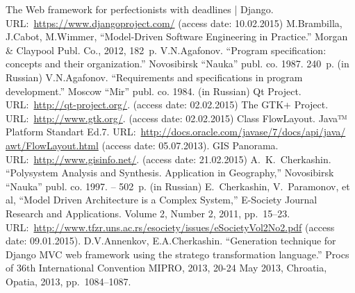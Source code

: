 \documentclass[conference]{IEEEtran}
\begin{document}
%
%
%
\vspace{1.4em} %
\begin{thebibliography}{11}
 The Web framework for perfectionists with deadlines | Django.   URL:~\url{https://www.djangoproject.com/} (access date: 10.02.2015)
 M.Brambilla, J.Cabot, M.Wimmer, ``Model-Driven Software Engineering in Practice.'' Morgan \& Claypool Publ. Co., 2012, 182~p.
 V.N.Agafonov. ``Program specification: concepts and their organization.'' Novosibirsk ``Nauka'' publ. co. 1987. 240~p. (in Russian)
 V.N.Agafonov. ``Requirements and specifications in program development.'' Moscow ``Mir'' publ. co. 1984. (in Russian)
 Qt Project. URL:~\url{http://qt-project.org/}. (access date: 02.02.2015)
 The GTK+ Project. URL:~\url{http://www.gtk.org/}. (access date: 02.02.2015)
Class FlowLayout. Java™ Platform Standart Ed.7. URL:~\url{http:/​/​docs.oracle.com/​javase/​7/​docs/​api/​java/​awt/​FlowLayout.html} (access date: 05.07.2013).
GIS Panorama. URL:~\url{http://www.gisinfo.net/}. (access date: 21.02.2015)
 A.~K.~Cherkashin. ``Polysystem Analysis and
  Synthesis. Application in Geography,'' Novosibirsk ``Nauka'' publ. co.
  1997. -- 502~p. (in Russian)
 E.~Cherkashin, V.~Paramonov, et al, ``Model Driven
  Architecture is a Complex System,'' E-Society Journal Research and
  Applications. Volume 2, Number 2, 2011, pp.~15--23.
  URL:~\url{http://www.tfzr.uns.ac.rs/esociety/issues/eSocietyVol2No2.pdf} (access date: 09.01.2015).
 D.V.Annenkov, E.A.Cherkashin. ``Generation technique for Django MVC web framework using the stratego transformation language.'' Procs of 36th International Convention MIPRO, 2013, 20-24 May 2013, Chroatia, Opatia, 2013, pp.~1084--1087.

\end{thebibliography}
\vspace{-2em}\mbox{} %
\end{document}

